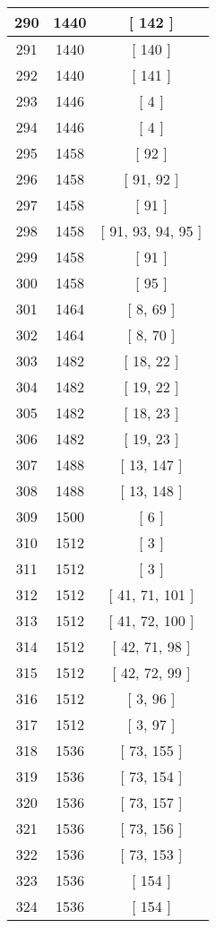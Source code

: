 \begin{center}
\begin{longtable}[H]{|| c c c ||}
\hline
290 & 1440 & [ 142 ] \\ 
\hline
291 & 1440 & [ 140 ] \\ 
\hline
292 & 1440 & [ 141 ] \\ 
\hline
293 & 1446 & [ 4 ] \\ 
\hline
294 & 1446 & [ 4 ] \\ 
\hline
295 & 1458 & [ 92 ] \\ 
\hline
296 & 1458 & [ 91, 92 ] \\ 
\hline
297 & 1458 & [ 91 ] \\ 
\hline
298 & 1458 & [ 91, 93, 94, 95 ] \\ 
\hline
299 & 1458 & [ 91 ] \\ 
\hline
300 & 1458 & [ 95 ] \\ 
\hline
301 & 1464 & [ 8, 69 ] \\ 
\hline
302 & 1464 & [ 8, 70 ] \\ 
\hline
303 & 1482 & [ 18, 22 ] \\ 
\hline
304 & 1482 & [ 19, 22 ] \\ 
\hline
305 & 1482 & [ 18, 23 ] \\ 
\hline
306 & 1482 & [ 19, 23 ] \\ 
\hline
307 & 1488 & [ 13, 147 ] \\ 
\hline
308 & 1488 & [ 13, 148 ] \\ 
\hline
309 & 1500 & [ 6 ] \\ 
\hline
310 & 1512 & [ 3 ] \\ 
\hline
311 & 1512 & [ 3 ] \\ 
\hline
312 & 1512 & [ 41, 71, 101 ] \\ 
\hline
313 & 1512 & [ 41, 72, 100 ] \\ 
\hline
314 & 1512 & [ 42, 71, 98 ] \\ 
\hline
315 & 1512 & [ 42, 72, 99 ] \\ 
\hline
316 & 1512 & [ 3, 96 ] \\ 
\hline
317 & 1512 & [ 3, 97 ] \\ 
\hline
318 & 1536 & [ 73, 155 ] \\ 
\hline
319 & 1536 & [ 73, 154 ] \\ 
\hline
320 & 1536 & [ 73, 157 ] \\ 
\hline
321 & 1536 & [ 73, 156 ] \\ 
\hline
322 & 1536 & [ 73, 153 ] \\ 
\hline
323 & 1536 & [ 154 ] \\ 
\hline
324 & 1536 & [ 154 ] \\ 
\hline

\end{longtable}
\end{center}
